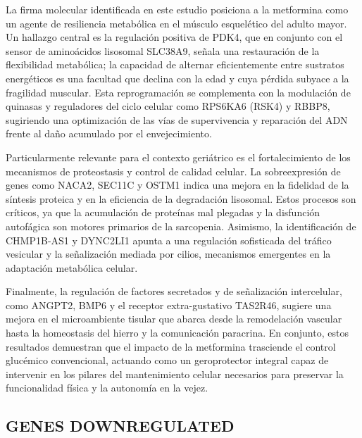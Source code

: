\documentclass[
  spanish,
  11pt,
]{article}
\begin{document}
La firma molecular identificada en este estudio posiciona a la
metformina como un agente de resiliencia metabólica en el músculo
esquelético del adulto mayor. Un hallazgo central es la regulación
positiva de PDK4, que en conjunto con el sensor de aminoácidos lisosomal
SLC38A9, señala una restauración de la flexibilidad metabólica; la
capacidad de alternar eficientemente entre sustratos energéticos es una
facultad que declina con la edad y cuya pérdida subyace a la fragilidad
muscular. Esta reprogramación se complementa con la modulación de
quinasas y reguladores del ciclo celular como RPS6KA6 (RSK4) y RBBP8,
sugiriendo una optimización de las vías de supervivencia y reparación
del ADN frente al daño acumulado por el envejecimiento.

Particularmente relevante para el contexto geriátrico es el
fortalecimiento de los mecanismos de proteostasis y control de calidad
celular. La sobreexpresión de genes como NACA2, SEC11C y OSTM1 indica
una mejora en la fidelidad de la síntesis proteica y en la eficiencia de
la degradación lisosomal. Estos procesos son críticos, ya que la
acumulación de proteínas mal plegadas y la disfunción autofágica son
motores primarios de la sarcopenia. Asimismo, la identificación de
CHMP1B-AS1 y DYNC2LI1 apunta a una regulación sofisticada del tráfico
vesicular y la señalización mediada por cilios, mecanismos emergentes en
la adaptación metabólica celular.

Finalmente, la regulación de factores secretados y de señalización
intercelular, como ANGPT2, BMP6 y el receptor extra-gustativo TAS2R46,
sugiere una mejora en el microambiente tisular que abarca desde la
remodelación vascular hasta la homeostasis del hierro y la comunicación
paracrina. En conjunto, estos resultados demuestran que el impacto de la
metformina trasciende el control glucémico convencional, actuando como
un geroprotector integral capaz de intervenir en los pilares del
mantenimiento celular necesarios para preservar la funcionalidad física
y la autonomía en la vejez.

\subsection{GENES DOWNREGULATED}\label{genes-downregulated}
\end{document}
